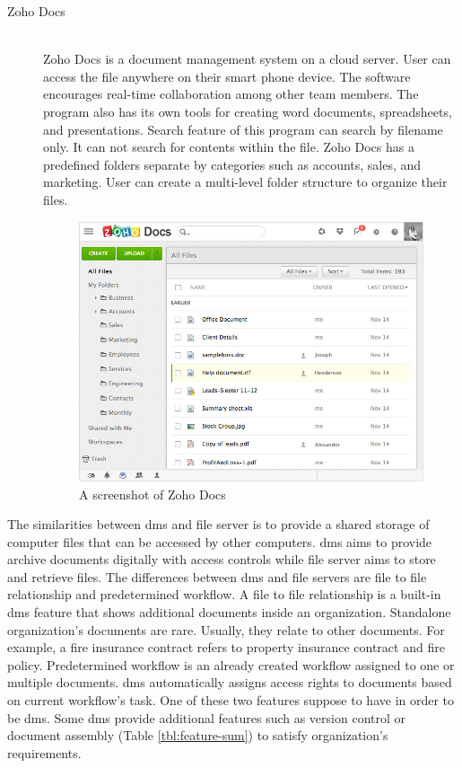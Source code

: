 \begin{description}
\item[Zoho Docs] \hfill \\
Zoho Docs is a document management system on a cloud server.
User can access the file anywhere on their smart phone device.
The software encourages real-time collaboration among other team members.
The program also has its own tools for creating word documents, spreadsheets, and presentations.
Search feature of this program can search by filename only.
It can not search for contents within the file.
Zoho Docs has a predefined folders separate by categories such as accounts, sales, and marketing.
User can create a multi-level folder structure to organize their files.
\begin{figure}[h]
	\centering
	\includegraphics[scale=0.55]{res/literature/screenshot_zoho}
	\caption{A screenshot of Zoho Docs  \cite{zoho-doc}}
\end{figure}
\end{description}

The similarities between \gls{dms} and file server is to provide a shared storage of computer files that can be accessed by other computers.
\gls{dms} aims to provide archive documents digitally with access controls while file server aims to store and retrieve files.
The differences between \gls{dms} and file servers are file to file relationship and predetermined workflow.
A file to file relationship is a built-in \gls{dms} feature that shows additional documents inside an organization.
Standalone organization's documents are rare.
Usually, they relate to other documents.
For example, a fire insurance contract refers to property insurance contract and fire policy.
Predetermined workflow is an already created workflow assigned to one or multiple documents.
\gls{dms} automatically assigns access rights to documents based on current workflow's task.
One of these two features suppose to have in order to be \gls{dms}.
Some \gls{dms} provide additional features such as version control or document assembly (Table \ref{tbl:feature-sum}) to satisfy organization's requirements.

